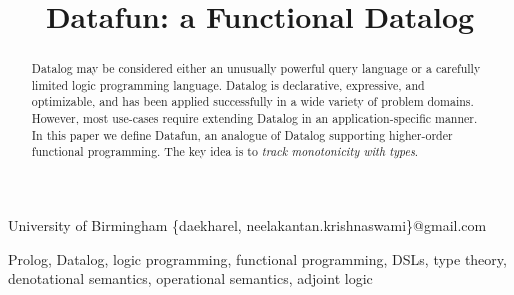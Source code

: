 \documentclass[preprint]{sigplanconf}
\begin{document}
\setlength{\pdfpageheight}{\paperheight}
\setlength{\pdfpagewidth}{\paperwidth}





\title{Datafun: a Functional Datalog}
\subtitle{}

           {University of Birmingham}
           {\{daekharel, neelakantan.krishnaswami\}@gmail.com}

\maketitle


\begin{abstract}
  Datalog may be considered either an unusually powerful query language or a
  carefully limited logic programming language. Datalog is declarative,
  expressive, and optimizable, and has been applied successfully in a wide
  variety of problem domains. However, most use-cases require extending Datalog
  in an application-specific manner. In this paper we define Datafun, an
  analogue of Datalog supporting higher-order functional programming. The key
  idea is to \emph{track monotonicity with types}.

\end{abstract}

%
%
\keywords Prolog, Datalog, logic programming, functional programming, DSLs,
type theory, denotational semantics, operational semantics, adjoint
logic



\end{document}
